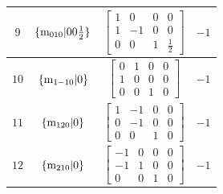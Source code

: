 \documentclass[fleqn,8pt]{jsarticle}
\begin{document}
\begin{longtable}{cccc}
$ 9 $ & $ \{{\rm m}_{010}|0 0 \frac{1}{2}\} $ & $ \begin{bmatrix} 1 & 0 & 0 & 0 \\ 1 & -1 & 0 & 0 \\ 0 & 0 & 1 & \frac{1}{2} \end{bmatrix} $ & $ -1 $ \\ \hline
$ 10 $ & $ \{{\rm m}_{1-10}|0\} $ & $ \begin{bmatrix} 0 & 1 & 0 & 0 \\ 1 & 0 & 0 & 0 \\ 0 & 0 & 1 & 0 \end{bmatrix} $ & $ -1 $ \\ \hline
$ 11 $ & $ \{{\rm m}_{120}|0\} $ & $ \begin{bmatrix} 1 & -1 & 0 & 0 \\ 0 & -1 & 0 & 0 \\ 0 & 0 & 1 & 0 \end{bmatrix} $ & $ -1 $ \\ \hline
$ 12 $ & $ \{{\rm m}_{210}|0\} $ & $ \begin{bmatrix} -1 & 0 & 0 & 0 \\ -1 & 1 & 0 & 0 \\ 0 & 0 & 1 & 0 \end{bmatrix} $ & $ -1 $ \\
\end{longtable}
\end{document}
